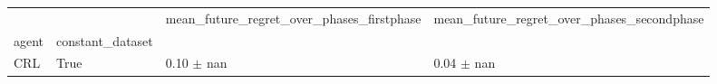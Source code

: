 \begin{tabular}{llll}
\toprule
 &  & mean_future_regret_over_phases_firstphase & mean_future_regret_over_phases_secondphase \\
agent & constant_dataset &  &  \\
\midrule
CRL & True & 0.10 $\pm$ nan & 0.04 $\pm$ nan \\
\cline{1-4}
\bottomrule
\end{tabular}
